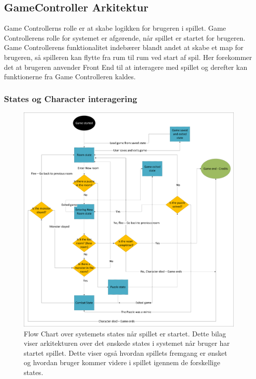 \subsection{GameController Arkitektur}
Game Controllerns rolle er at skabe logikken for brugeren i spillet. Game Controllerens rolle for systemet er afgørende, når spillet er startet for brugeren. Game Controllerens funktionalitet indebærer blandt andet at skabe et map for brugeren, så spilleren kan flytte fra rum til rum ved start af spil. Her forekommer det at brugeren anvender Front End til at interagere med spillet og derefter kan funktionerne fra Game Controlleren kaldes.
\subsubsection{States og Character interagering}
\begin{figure}[H]
\centering
\includegraphics[width = \textwidth]{02-Body/Images/Arkitektur - State Logic.pdf}
\caption{Flow Chart over systemets states når spillet er startet. Dette bilag viser arkitekturen over det ønskede states i systemet når bruger har startet spillet. Dette viser også hvordan spillets fremgang er ønsket og hvordan bruger kommer videre i spillet igennem de forskellige states.}
\end{figure}

